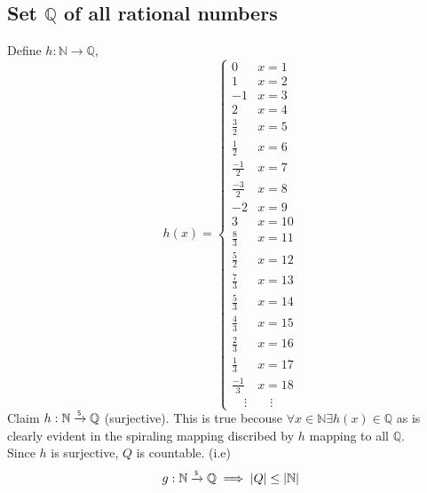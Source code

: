 \documentclass[]{article}
\newcommand{\N}{\mathbb{N}}
\newcommand{\Q}{\mathbb{Q}}
\newcommand{\toS}{\xrightarrow{\textsf{\tiny S}}}
\begin{document}
\subsection{Set $\Q$ of all rational numbers}
Define $h : \N \to \Q$,
\begin{displaymath}
	h(x) = 
	\begin{cases}
		0	& x = 1\\
		1	& x = 2\\
		-1	& x = 3\\
		2	& x = 4\\
		\frac{3}{2}	& x = 5\\
		\frac{1}{2} & x = 6\\
		\frac{-1}{2}& x = 7\\
		\frac{-3}{2}& x = 8\\
		-2	& x = 9\\
		3	& x = 10\\
		\frac{8}{3} & x = 11\\
		\frac{5}{2} & x = 12\\
		\frac{7}{3} & x = 13\\
		\frac{5}{3} & x = 14\\
		\frac{4}{3} & x = 15\\
		\frac{2}{3} & x = 16\\
		\frac{1}{3} & x = 17\\
		\frac{-1}{3} & x = 18\\
		\quad \vdots & \quad \vdots
	\end{cases}
\end{displaymath}
Claim $h : \N \toS \Q$ (surjective).
This is true becouse $\forall x \in \N \exists h(x) \in \Q$ as is 
clearly evident in the spiraling mapping discribed by $h$ mapping to all $\Q$.\\

Since $h$ is surjective, $Q$ is countable. (i.e)
$$g : \N \toS \Q \implies \abs{Q} \leq \abs{\N}$$
\end{document}
